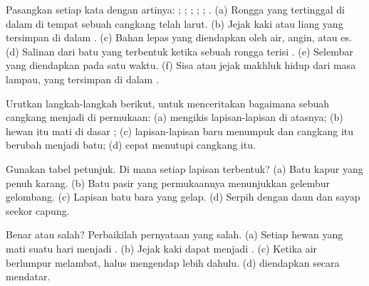 \begin{exercise}[$\star$]\label{exo:g7:sediments-and-fossils:1}
Pasangkan setiap kata dengan artinya: ; ; ; ;
; . (a) Rongga yang tertinggal di dalam  di tempat
sebuah cangkang telah larut. (b) Jejak kaki atau liang yang tersimpan di
dalam . (c) Bahan lepas yang diendapkan oleh air, angin, atau es.
(d) Salinan dari batu yang terbentuk ketika sebuah rongga terisi .
(e) Selembar  yang diendapkan pada satu waktu. (f) Sisa atau jejak
makhluk hidup dari masa lampau, yang tersimpan di dalam .
\end{exercise}

\begin{exercise}[$\star$]\label{exo:g7:sediments-and-fossils:2}
Urutkan langkah-langkah berikut, untuk menceritakan bagaimana sebuah
cangkang menjadi  di permukaan: (a)  mengikis lapisan-lapisan di
atasnya; (b) hewan itu mati di dasar ; (c) lapisan-lapisan baru
menumpuk dan cangkang itu berubah menjadi batu; (d)  cepat menutupi
cangkang itu.
\end{exercise}

\begin{exercise}[$\star$]\label{exo:g7:sediments-and-fossils:3}
Gunakan tabel petunjuk. Di mana setiap lapisan terbentuk? (a) Batu kapur
yang penuh karang. (b) Batu pasir yang permukaannya menunjukkan gelembur
gelombang. (c) Lapisan batu bara yang gelap. (d) Serpih dengan  daun
dan sayap seekor capung.
\end{exercise}

\begin{exercise}[$\star$]\label{exo:g7:sediments-and-fossils:4}
Benar atau salah? Perbaikilah pernyataan yang salah. (a) Setiap hewan yang
mati suatu hari menjadi . (b) Jejak kaki dapat menjadi .
(c) Ketika air berlumpur melambat,  halus mengendap lebih dahulu.
(d)  diendapkan secara mendatar.
\end{exercise}


